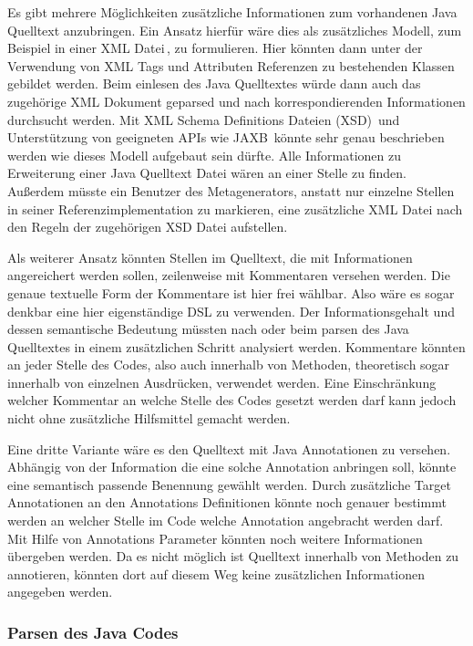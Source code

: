 \documentclass[12pt,oneside,a4paper,parskip]{scrbook}
\begin{document}
Es gibt mehrere Möglichkeiten zusätzliche Informationen zum vorhandenen Java Quelltext anzubringen. Ein Ansatz hierfür wäre dies als zusätzliches Modell, zum Beispiel in einer XML Datei\,\cite{xml2008}, zu formulieren. Hier könnten dann unter der Verwendung von XML Tags und Attributen Referenzen zu bestehenden Klassen gebildet werden. Beim einlesen des Java Quelltextes würde dann auch das zugehörige XML Dokument geparsed und nach korrespondierenden Informationen durchsucht werden. Mit XML Schema Definitions Dateien (XSD)\,\cite{xsd2012} und Unterstützung von geeigneten APIs wie JAXB\,\cite{jaxb} könnte sehr genau beschrieben werden wie dieses Modell aufgebaut sein dürfte. Alle Informationen zu Erweiterung einer Java Quelltext Datei wären an einer Stelle zu finden. Außerdem müsste ein Benutzer des Metagenerators, anstatt nur einzelne Stellen in seiner Referenzimplementation zu markieren, eine zusätzliche XML Datei nach den Regeln der zugehörigen XSD Datei aufstellen.

Als weiterer Ansatz könnten Stellen im Quelltext, die mit Informationen angereichert werden sollen, zeilenweise mit Kommentaren versehen werden. Die genaue textuelle Form der Kommentare ist hier frei wählbar. Also wäre es sogar denkbar eine hier eigenständige DSL zu verwenden. Der Informationsgehalt und dessen semantische Bedeutung müssten nach oder beim parsen des Java Quelltextes in einem zusätzlichen Schritt analysiert werden. Kommentare könnten an jeder Stelle des Codes, also auch innerhalb von Methoden, theoretisch sogar innerhalb von einzelnen Ausdrücken, verwendet werden. Eine Einschränkung welcher Kommentar an welche Stelle des Codes gesetzt werden darf kann jedoch nicht ohne zusätzliche Hilfsmittel gemacht werden.

Eine dritte Variante wäre es den Quelltext mit Java Annotationen zu versehen. Abhängig von der Information die eine solche Annotation anbringen soll, könnte eine semantisch passende Benennung gewählt werden. Durch zusätzliche Target Annotationen an den Annotations Definitionen könnte noch genauer bestimmt werden an welcher Stelle im Code welche Annotation angebracht werden darf. Mit Hilfe von Annotations Parameter könnten noch weitere Informationen übergeben werden. Da es nicht möglich ist Quelltext innerhalb von Methoden zu annotieren, könnten dort auf diesem Weg keine zusätzlichen Informationen angegeben werden.

\subsubsection{Parsen des Java Codes}
\end{document}

